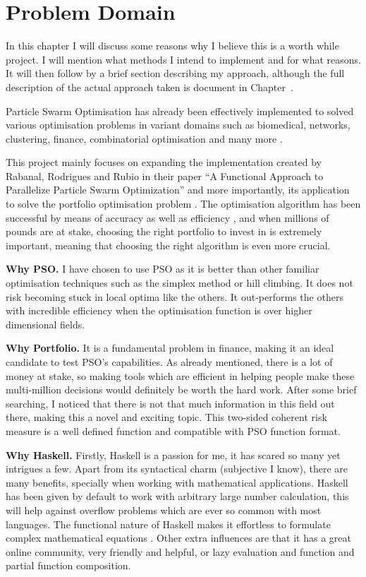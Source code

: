 \chapter{Problem Domain}
  In this chapter I will discuss some reasons why I believe this is a worth while project. I will mention what methods I intend to implement and for what reasons. It will then follow by a brief section describing my approach, although the full description of the actual approach taken is document in Chapter~.
  
  Particle Swarm Optimisation has already been effectively implemented to solved various optimisation problems \cite{pso_app,pso_app2,pso_app3} in variant domains such as biomedical, networks, clustering, finance, combinatorial optimisation and many more \cite{pso_app_main}. 

  This project mainly focuses on expanding the implementation created by Rabanal, Rodrigues and Rubio in their paper ``A Functional Approach to Parallelize Particle Swarm Optimization'' and more importantly, its application to solve the portfolio optimisation problem \cite{marko2}. The optimisation algorithm has been successful by means of accuracy as well as efficiency \cite{haskellPSO}, and when millions of pounds are at stake, choosing the right portfolio to invest in is extremely important, meaning that choosing the right algorithm is even more crucial.

  \textbf{Why PSO.} I have chosen to use PSO as it is better than other familiar optimisation techniques such as the simplex method or hill climbing. It does not risk becoming stuck in local optima like the others. It out-performs the others with incredible efficiency when the optimisation function is over higher dimensional fields. 

  \textbf{Why Portfolio.} It is a fundamental problem in finance, making it an ideal candidate to test PSO's capabilities. As already mentioned, there is a lot of money at stake, so making tools which are efficient in helping people make these multi-million decisions would definitely be worth the hard work. After some brief searching, I noticed that there is not that much information in this field out there, making this a novel and exciting topic. This two-sided coherent risk measure is a well defined function and compatible with PSO function format. 

  \textbf{Why Haskell.} Firstly, Haskell is a passion for me, it has scared so many yet intrigues a few. Apart from its syntactical charm (subjective I know), there are many benefits, specially when working with mathematical applications. Haskell has been given by default to work with arbitrary large number calculation, this will help against overflow problems which are ever so common with most languages. The functional nature of Haskell makes it effortless to formulate complex mathematical equations \cite{haskellPSO}. Other extra influences are that it has a great online community, very friendly and helpful, or lazy evaluation and function and partial function composition. 

